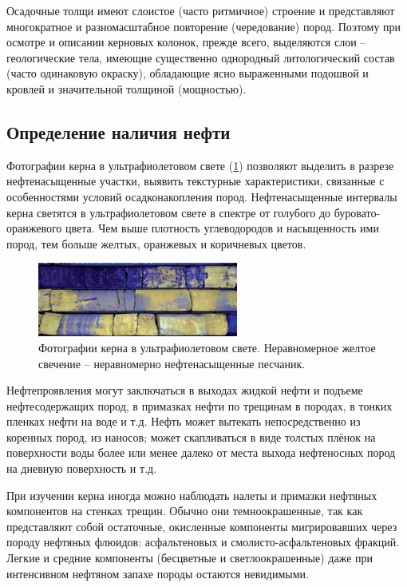 \documentclass[14pt]{matmex-diploma}
\begin{document}
        Осадочные толщи имеют слоистое (часто ритмичное) строение и представляют многократное и разномасштабное повторение (чередование) пород. Поэтому при осмотре и описании керновых колонок, прежде всего, выделяются слои – геологические тела, имеющие существенно однородный литологический состав (часто одинаковую окраску), обладающие ясно выраженными подошвой и кровлей и значительной толщиной (мощностью).
        
    \subsection*{Определение наличия нефти}
    
        Фотографии керна в ультрафиолетовом свете (\ref{UV}) позволяют выделить в разрезе нефтенасыщенные участки, выявить текстурные характеристики, связанные с особенностями условий осадконакопления пород. Нефтенасыщенные интервалы керна светятся в ультрафиолетовом свете в спектре от голубого до буровато-оранжевого цвета. Чем выше плотность углеводородов и насыщенность ими пород, тем больше желтых, оранжевых и коричневых цветов. \cite{paper:kern}
        
        \begin{figure}[h]
            \centering
            \includegraphics[scale=1]{images/UV.png}
            \caption{Фотографии керна в ультрафиолетовом свете. Неравномерное желтое свечение – неравномерно нефтенасыщенные песчаник.}
            \label{UV}
        \end{figure}        
        
        Нефтепроявления могут заключаться в выходах жидкой нефти и подъеме нефтесодержащих пород, в примазках нефти по трещинам в породах, в тонких пленках нефти на воде и т.д. Нефть может вытекать непосредственно из коренных пород, из наносов; может скапливаться в виде толстых плёнок на поверхности воды более или менее далеко от места выхода нефтеносных пород на дневную поверхность и т.д.
        
        При изучении керна иногда можно наблюдать налеты и примазки нефтяных компонентов на стенках трещин. Обычно они темноокрашенные, так как представляют собой остаточные, окисленные компоненты мигрировавших через породу нефтяных флюидов: асфальтеновых и смолисто-асфальтеновых фракций. Легкие и средние компоненты (бесцветные и светлоокрашенные) даже при интенсивном нефтяном запахе породы остаются невидимыми.
        
\end{document}
